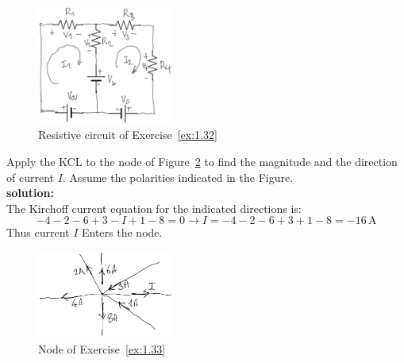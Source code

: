\begin{figure}[h!]
  \centering
  \includegraphics[width=0.4\textwidth]{"images/Fig-11"}
  \caption{Resistive circuit of Exercise~\ref{ex:1.32}} 
  \label{Fig:Ex:1.32}
\end{figure}

\begin{exercise}
\label{ex:1.33}
Apply the KCL to the node of Figure~\ref{Fig:Ex:1.33} to find the magnitude and the direction of current $I$. Assume the polarities indicated in the Figure.\\

\textbf{solution:}\\
The Kirchoff current equation for the indicated directions is:
\[-4 -2 -6 +3 -I +1 -8 = 0 \longrightarrow I = -4 -2 -6 +3 +1 -8 = -16\,\textrm{A}\]
Thus current $I$ Enters the node.
\end{exercise}

\begin{figure}[h!]
  \centering
  \includegraphics[width=0.4\textwidth]{"images/Fig-12"}
  \caption{Node of Exercise~\ref{ex:1.33}} 
  \label{Fig:Ex:1.33}
\end{figure}


